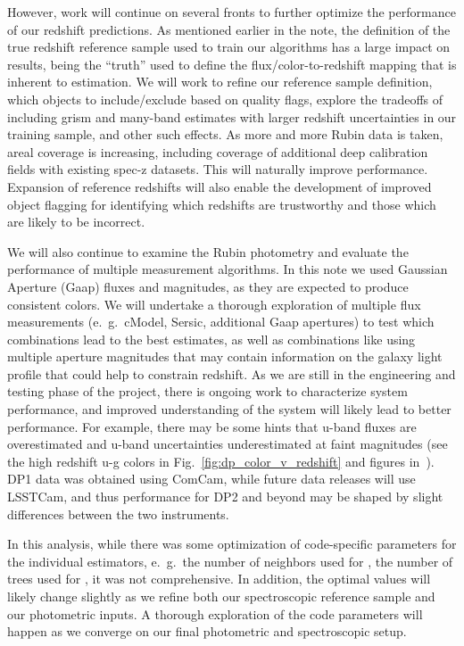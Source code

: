 However, work will continue on several fronts to further optimize the performance of our redshift predictions.  As mentioned earlier in the note, the definition of the true redshift reference sample used to train our algorithms has a large impact on results, being the ``truth'' used to define the flux/color-to-redshift mapping that is inherent to \photoz estimation.  We will work to refine our reference sample definition, which objects to include/exclude based on quality flags, explore the tradeoffs of including grism and many-band \photoz estimates with larger redshift uncertainties in our training sample, and other such effects.  As more and more Rubin data is taken, areal coverage is increasing, including coverage of additional deep calibration fields with existing spec-z datasets.  This will naturally improve \photoz performance.  Expansion of reference redshifts will also enable the development of improved object flagging for identifying which redshifts are trustworthy and those which are likely to be incorrect.

We will also continue to examine the Rubin photometry and evaluate the performance of multiple measurement algorithms.  In this note we used Gaussian Aperture (Gaap) fluxes and magnitudes, as they are expected to produce consistent colors.  We will undertake a thorough exploration of multiple flux measurements (e.~g.~cModel, Sersic, additional Gaap apertures) to test which combinations lead to the best \photoz estimates, as well as combinations like using multiple aperture magnitudes that may contain information on the galaxy light profile that could help to constrain redshift.  As we are still in the engineering and testing phase of the project, there is ongoing work to characterize system performance, and improved understanding of the system will likely lead to better \photoz performance.  For example, there may be some hints that u-band fluxes are overestimated and u-band uncertainties underestimated at faint magnitudes (see the high redshift u-g colors in Fig.~\ref{fig:dp_color_v_redshift} and figures in~\citet{RTN:095}).  DP1 data was obtained using ComCam, while future data releases will use LSSTCam, and thus performance for DP2 and beyond may be shaped by slight differences between the two instruments.  

In this analysis, while there was some optimization of code-specific parameters for the individual estimators, e.~g.~the number of neighbors used for , the number of trees used for , it was not comprehensive.  In addition, the optimal values will likely change slightly as we refine both our spectroscopic reference sample and our photometric inputs.  A thorough exploration of the code parameters will happen as we converge on our final photometric and spectroscopic setup.

